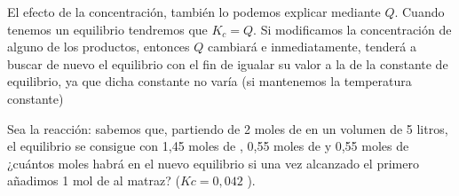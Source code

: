     El efecto de la concentración, también lo podemos explicar mediante \( Q \).
    Cuando tenemos un equilibrio tendremos que \( K_c = Q \).
    Si modificamos la concentración de alguno de los productos, entonces \( Q \) cambiará e inmediatamente, tenderá a buscar de nuevo el equilibrio con el fin de igualar su valor a la de la constante de equilibrio, ya que dicha constante no varía (si mantenemos la temperatura constante)

    \begin{example}
        Sea la reacción:   sabemos que, partiendo de 2 moles de  en un volumen de 5 litros, el equilibrio se consigue con 1,45 moles de , 0,55 moles de  y 0,55 moles de  ¿cuántos moles habrá en el nuevo equilibrio si una vez alcanzado el primero añadimos 1 mol de  al matraz? (\( Kc = 0,042 \) ).


\end{example}

